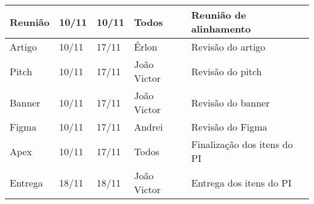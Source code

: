 \documentclass[
landscape,
  a4paper,%
  12pt,%
  english,%
  brazilian,%
]{article}
\begin{document}
\begin{table}[]
\begin{tabular}{|l|l|l|l|l|}
Reunião&10/11&10/11&Todos&Reunião de alinhamento\\ \hline
Artigo&10/11&17/11&Érlon&Revisão do artigo\\ \hline
Pitch&10/11&17/11&João Victor&Revisão do pitch\\ \hline
Banner&10/11&17/11&João Victor&Revisão do banner\\ \hline
Figma&10/11&17/11&Andrei&Revisão do Figma\\ \hline
Apex&10/11&17/11&Todos&Finalização dos itens do PI\\ \hline
Entrega&18/11&18/11&João Victor&Entrega dos itens do PI\\ \hline
\end{tabular}
\end{table}
\end{document}
